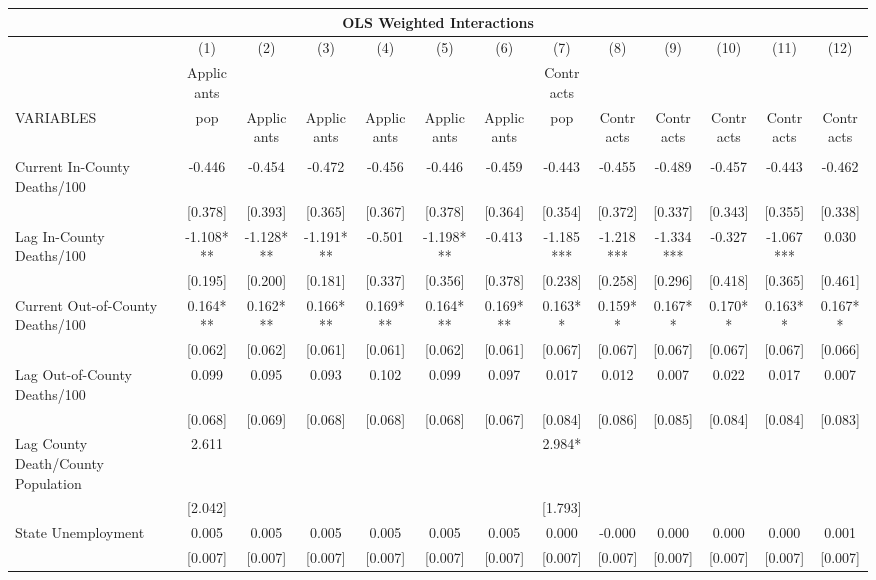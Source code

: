 \documentclass[]{article}
\begin{document}
\begin{tabular}{lcccccccccccc}
\multicolumn{13}{c}{OLS Weighted Interactions} \\ \hline
 & (1) & (2) & (3) & (4) & (5) & (6) & (7) & (8) & (9) & (10) & (11) & (12) \\
 & Applicants &  &  &  &  &  & Contracts &  &  &  &  &  \\
VARIABLES & pop & Applicants & Applicants & Applicants & Applicants & Applicants & pop & Contracts & Contracts & Contracts & Contracts & Contracts \\ \hline
 &  &  &  &  &  &  &  &  &  &  &  &  \\
Current In-County Deaths/100 & -0.446 & -0.454 & -0.472 & -0.456 & -0.446 & -0.459 & -0.443 & -0.455 & -0.489 & -0.457 & -0.443 & -0.462 \\
 & [0.378] & [0.393] & [0.365] & [0.367] & [0.378] & [0.364] & [0.354] & [0.372] & [0.337] & [0.343] & [0.355] & [0.338] \\
Lag In-County Deaths/100 & -1.108*** & -1.128*** & -1.191*** & -0.501 & -1.198*** & -0.413 & -1.185*** & -1.218*** & -1.334*** & -0.327 & -1.067*** & 0.030 \\
 & [0.195] & [0.200] & [0.181] & [0.337] & [0.356] & [0.378] & [0.238] & [0.258] & [0.296] & [0.418] & [0.365] & [0.461] \\
Current Out-of-County Deaths/100 & 0.164*** & 0.162*** & 0.166*** & 0.169*** & 0.164*** & 0.169*** & 0.163** & 0.159** & 0.167** & 0.170** & 0.163** & 0.167** \\
 & [0.062] & [0.062] & [0.061] & [0.061] & [0.062] & [0.061] & [0.067] & [0.067] & [0.067] & [0.067] & [0.067] & [0.066] \\
Lag Out-of-County Deaths/100 & 0.099 & 0.095 & 0.093 & 0.102 & 0.099 & 0.097 & 0.017 & 0.012 & 0.007 & 0.022 & 0.017 & 0.007 \\
 & [0.068] & [0.069] & [0.068] & [0.068] & [0.068] & [0.067] & [0.084] & [0.086] & [0.085] & [0.084] & [0.084] & [0.083] \\
Lag County Death/County Population & 2.611 &  &  &  &  &  & 2.984* &  &  &  &  &  \\
 & [2.042] &  &  &  &  &  & [1.793] &  &  &  &  &  \\
State Unemployment & 0.005 & 0.005 & 0.005 & 0.005 & 0.005 & 0.005 & 0.000 & -0.000 & 0.000 & 0.000 & 0.000 & 0.001 \\
 & [0.007] & [0.007] & [0.007] & [0.007] & [0.007] & [0.007] & [0.007] & [0.007] & [0.007] & [0.007] & [0.007] & [0.007] \\

\end{tabular}
\end{document}
